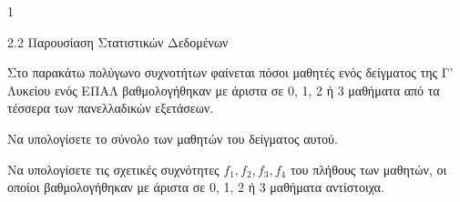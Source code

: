 \begin{ylh}{1}
	\item 2.2 Παρουσίαση Στατιστικών Δεδομένων
\end{ylh}
\begin{center}
	\vspace{-1em}
\end{center}
Στο παρακάτω πολύγωνο συχνοτήτων φαίνεται πόσοι μαθητές ενός δείγματος της Γ' Λυκείου ενός ΕΠΑΛ βαθμολογήθηκαν με άριστα σε 0, 1, 2 ή 3 μαθήματα από τα τέσσερα των πανελλαδικών εξετάσεων.
\begin{alist}
	\item Να υπολογίσετε το σύνολο των μαθητών του δείγματος αυτού. 
	\item Να υπολογίσετε τις σχετικές συχνότητες $f_1,f_2,f_3,f_4$ του πλήθους των μαθητών, οι οποίοι βαθμολογήθηκαν με άριστα σε 0, 1, 2 ή 3 μαθήματα αντίστοιχα. 
\end{alist}

